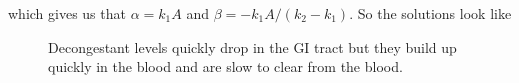 \documentclass{unswmaths}
\begin{document}
which gives us that $ \alpha = k_1 A $ and $ \beta = -k_1 A / (k_2 - k_1 ) $.
So the solutions look like
\begin{figure}[H]

Decongestant levels quickly drop in the GI tract but they build up quickly in the blood and are slow to clear from the blood.
\end{figure}
\end{document}
